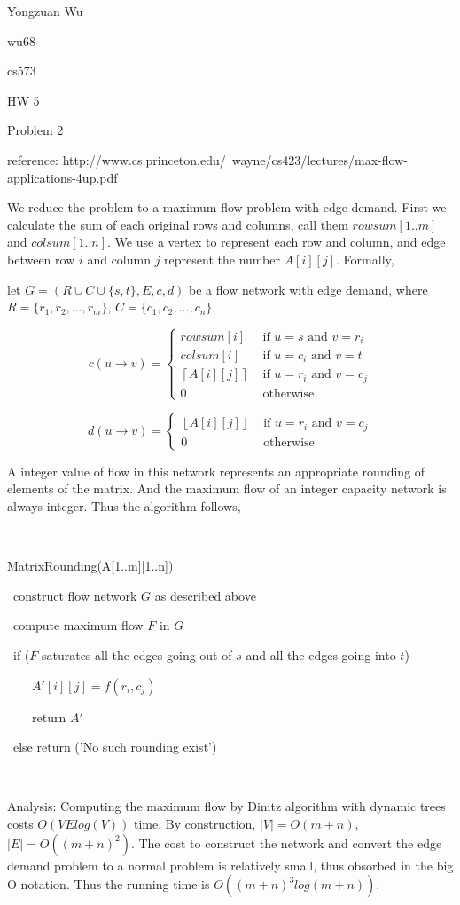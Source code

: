 \documentclass[a4paper,12pt]{article}
\begin{document}
Yongzuan Wu

wu68

cs573

HW 5

Problem 2

reference: http://www.cs.princeton.edu/~wayne/cs423/lectures/max-flow-applications-4up.pdf

We reduce the problem to a maximum flow problem with edge demand. First we calculate the sum of each original rows and columns, call them $rowsum[1..m]$ and $colsum[1..n]$. We use a vertex to represent each row and column, and edge between row $i$ and column $j$ represent the number $A[i][j]$. Formally,

let $G=(R\cup C\cup \{s,t\},E,c,d)$ be a flow network with edge demand, where $R=\{r_{1},r_{2},...,r_{m}\}$, $C=\{c_{1},c_{2},...,c_{n}\}$, 

$$
c(u\rightarrow v) = \left\{ \begin{array}{rl}
  rowsum[i] &\mbox{ if $u=s$ and $v=r_{i}$} \\
  colsum[i] &\mbox{ if $u=c_{i}$ and $v=t$} \\
  \left\lceil A[i][j]\right\rceil    &\mbox{ if $u=r_{i}$ and $v=c_{j}$} \\
  0 &\mbox{ otherwise}
       \end{array} \right.      
$$ 

$$
d(u\rightarrow v) = \left\{ \begin{array}{rl}
  \left\lfloor A[i][j]\right\rfloor    &\mbox{ if $u=r_{i}$ and $v=c_{j}$} \\
  0 &\mbox{ otherwise}
       \end{array} \right.      
$$ 

A integer value of flow in this network represents an appropriate rounding of elements of the matrix. And the maximum flow of an integer capacity network is always integer. Thus the algorithm follows,

\

MatrixRounding(A[1..m][1..n])

\ construct flow network $G$ as described above

\ compute maximum flow $F$ in $G$

\ if ($F$ saturates all the edges going out of $s$ and all the edges going into $t$)

\ \ \ \ $A'[i][j]=f(r_{i},c_{j})$

\ \ \ \ return $A'$

\ else return ('No such rounding exist')

\

Analysis:
Computing the maximum flow by Dinitz algorithm with dynamic trees costs $O(VElog(V))$ time. By construction, $\left|V\right|=O(m+n)$, $\left|E\right|=O((m+n)^{2})$. The cost to construct the network and convert the edge demand problem to a normal problem is relatively small, thus obsorbed in the big O notation. Thus the running time is $O((m+n)^3log(m+n))$.
\end{document}
